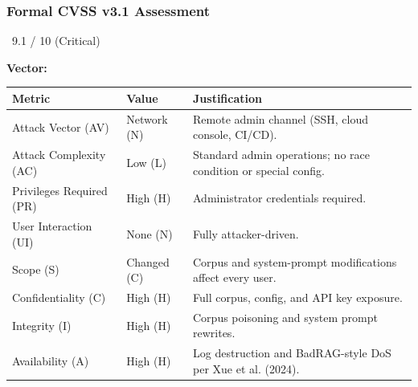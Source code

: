 \subsubsection{Formal CVSS v3.1 Assessment}

\begin{cvssbox}{\badgecritical\ 9.1 / 10 (Critical)}
\vspace{2pt}
\begin{center}
\textbf{Vector:}\enspace
{}
\end{center}
\vspace{8pt}
\begin{tabular}{W{3.4cm}W{2.2cm}W{7.8cm}}
\toprule
  
  \small\textbf{Metric} &
  \small\textbf{Value} &
  \small\textbf{Justification} \\
  \midrule
  
  \small Attack Vector (AV)     & \small Network (N) & \small Remote admin channel (SSH, cloud console, CI/CD). \\
  
  \small Attack Complexity (AC) & \small Low (L)     & \small Standard admin operations; no race condition or special config. \\
  
  \small Privileges Required (PR)  & \small High (H) & \small Administrator credentials required. \\
  
  \small User Interaction (UI)  & \small None (N)    & \small Fully attacker-driven. \\
  
  \small Scope (S)              & \small Changed (C) & \small Corpus and system-prompt modifications affect every user. \\
  
  \small Confidentiality (C)    & \small High (H)    & \small Full corpus, config, and API key exposure. \\
  
  \small Integrity (I)          & \small High (H)    & \small Corpus poisoning and system prompt rewrites. \\
  
  \small Availability (A)       & \small High (H)    & \small Log destruction and BadRAG-style DoS per Xue et al. (2024). \\
  \bottomrule
\end{tabular}
\vspace{6pt}


\end{cvssbox}
